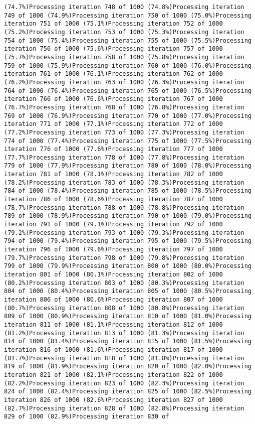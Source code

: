 \documentclass[
]{article}
\begin{document}
\begin{verbatim}
(74.7%)Processing iteration 748 of 1000 (74.8%)Processing iteration 749 of 1000 (74.9%)Processing iteration 750 of 1000 (75.0%)Processing iteration 751 of 1000 (75.1%)Processing iteration 752 of 1000 (75.2%)Processing iteration 753 of 1000 (75.3%)Processing iteration 754 of 1000 (75.4%)Processing iteration 755 of 1000 (75.5%)Processing iteration 756 of 1000 (75.6%)Processing iteration 757 of 1000 (75.7%)Processing iteration 758 of 1000 (75.8%)Processing iteration 759 of 1000 (75.9%)Processing iteration 760 of 1000 (76.0%)Processing iteration 761 of 1000 (76.1%)Processing iteration 762 of 1000 (76.2%)Processing iteration 763 of 1000 (76.3%)Processing iteration 764 of 1000 (76.4%)Processing iteration 765 of 1000 (76.5%)Processing iteration 766 of 1000 (76.6%)Processing iteration 767 of 1000 (76.7%)Processing iteration 768 of 1000 (76.8%)Processing iteration 769 of 1000 (76.9%)Processing iteration 770 of 1000 (77.0%)Processing iteration 771 of 1000 (77.1%)Processing iteration 772 of 1000 (77.2%)Processing iteration 773 of 1000 (77.3%)Processing iteration 774 of 1000 (77.4%)Processing iteration 775 of 1000 (77.5%)Processing iteration 776 of 1000 (77.6%)Processing iteration 777 of 1000 (77.7%)Processing iteration 778 of 1000 (77.8%)Processing iteration 779 of 1000 (77.9%)Processing iteration 780 of 1000 (78.0%)Processing iteration 781 of 1000 (78.1%)Processing iteration 782 of 1000 (78.2%)Processing iteration 783 of 1000 (78.3%)Processing iteration 784 of 1000 (78.4%)Processing iteration 785 of 1000 (78.5%)Processing iteration 786 of 1000 (78.6%)Processing iteration 787 of 1000 (78.7%)Processing iteration 788 of 1000 (78.8%)Processing iteration 789 of 1000 (78.9%)Processing iteration 790 of 1000 (79.0%)Processing iteration 791 of 1000 (79.1%)Processing iteration 792 of 1000 (79.2%)Processing iteration 793 of 1000 (79.3%)Processing iteration 794 of 1000 (79.4%)Processing iteration 795 of 1000 (79.5%)Processing iteration 796 of 1000 (79.6%)Processing iteration 797 of 1000 (79.7%)Processing iteration 798 of 1000 (79.8%)Processing iteration 799 of 1000 (79.9%)Processing iteration 800 of 1000 (80.0%)Processing iteration 801 of 1000 (80.1%)Processing iteration 802 of 1000 (80.2%)Processing iteration 803 of 1000 (80.3%)Processing iteration 804 of 1000 (80.4%)Processing iteration 805 of 1000 (80.5%)Processing iteration 806 of 1000 (80.6%)Processing iteration 807 of 1000 (80.7%)Processing iteration 808 of 1000 (80.8%)Processing iteration 809 of 1000 (80.9%)Processing iteration 810 of 1000 (81.0%)Processing iteration 811 of 1000 (81.1%)Processing iteration 812 of 1000 (81.2%)Processing iteration 813 of 1000 (81.3%)Processing iteration 814 of 1000 (81.4%)Processing iteration 815 of 1000 (81.5%)Processing iteration 816 of 1000 (81.6%)Processing iteration 817 of 1000 (81.7%)Processing iteration 818 of 1000 (81.8%)Processing iteration 819 of 1000 (81.9%)Processing iteration 820 of 1000 (82.0%)Processing iteration 821 of 1000 (82.1%)Processing iteration 822 of 1000 (82.2%)Processing iteration 823 of 1000 (82.3%)Processing iteration 824 of 1000 (82.4%)Processing iteration 825 of 1000 (82.5%)Processing iteration 826 of 1000 (82.6%)Processing iteration 827 of 1000 (82.7%)Processing iteration 828 of 1000 (82.8%)Processing iteration 829 of 1000 (82.9%)Processing iteration 830 of 
\end{verbatim}
\end{document}
